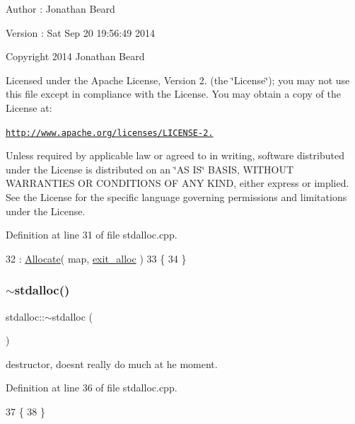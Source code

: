 \begin{DoxyAuthor}{Author}
\+: Jonathan Beard 
\end{DoxyAuthor}
\begin{DoxyVersion}{Version}
\+: Sat Sep 20 19\+:56\+:49 2014
\end{DoxyVersion}
Copyright 2014 Jonathan Beard

Licensed under the Apache License, Version 2. (the \char`\"{}\+License\char`\"{}); you may not use this file except in compliance with the License. You may obtain a copy of the License at\+:

\href{http://www.apache.org/licenses/LICENSE-2.0}{\tt http\+://www.\+apache.\+org/licenses/\+L\+I\+C\+E\+N\+S\+E-\/2.}

Unless required by applicable law or agreed to in writing, software distributed under the License is distributed on an \char`\"{}\+A\+S I\+S\char`\"{} B\+A\+S\+IS, W\+I\+T\+H\+O\+UT W\+A\+R\+R\+A\+N\+T\+I\+ES OR C\+O\+N\+D\+I\+T\+I\+O\+NS OF A\+NY K\+I\+ND, either express or implied. See the License for the specific language governing permissions and limitations under the License. 

Definition at line 31 of file stdalloc.\+cpp.


\begin{DoxyCode}
32                                                : \hyperlink{class_allocate_ab2b82e7fab9d0fccb9702effec93917b}{Allocate}( map, 
      \hyperlink{class_allocate_a4d10076b88ab1297c89b8a05e117b510}{exit\_alloc} )
33 \{
34 \}
\end{DoxyCode}
\hypertarget{classstdalloc_a46d60193ee113f34caf4ddf4385c9f0d}{}\label{classstdalloc_a46d60193ee113f34caf4ddf4385c9f0d} 
\subsubsection{\texorpdfstring{$\sim$stdalloc()}{~stdalloc()}}
{\footnotesize\ttfamily stdalloc\+::$\sim$stdalloc (\begin{DoxyParamCaption}{ }\end{DoxyParamCaption})\hspace{0.3cm}{\ttfamily [virtual]}}

destructor, doesn\textquotesingle{}t really do much at he moment. 

Definition at line 36 of file stdalloc.\+cpp.


\begin{DoxyCode}
37 \{
38 \}
\end{DoxyCode}


